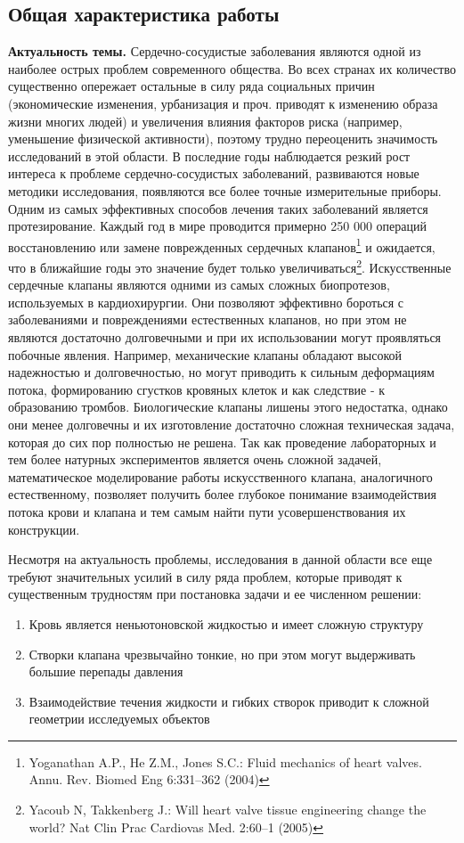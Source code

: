 \subsection*{\Large Общая характеристика работы}
\fontsize{14pt}{15pt}\selectfont
\textbf{Актуальность темы.}
Сердечно-сосудистые заболевания являются одной из наиболее острых проблем
современного общества. Во всех странах их количество существенно опережает
остальные в силу ряда социальных причин (экономические изменения, урбанизация и
проч. приводят к изменению образа жизни многих людей) и увеличения влияния
факторов риска (например, уменьшение физической активности), поэтому трудно
переоценить значимость исследований в этой области. В последние годы
наблюдается резкий рост интереса к проблеме сердечно-сосудистых заболеваний,
развиваются новые методики исследования, появляются все более точные
измерительные приборы. Одним из самых эффективных способов лечения таких
заболеваний является протезирование. Каждый год в мире проводится
примерно 250 000 операций восстановлению или замене поврежденных сердечных
клапанов\footnote{
    Yoganathan A.P., He Z.M., Jones S.C.: Fluid mechanics of heart valves.  Annu. Rev.
    Biomed Eng 6:331--362 (2004)
} %
и ожидается, что в ближайшие годы это значение будет только увеличиваться\footnote{
    Yacoub N, Takkenberg J.: Will heart valve tissue engineering change the world? Nat
    Clin Prac Cardiovas Med. 2:60--1 (2005)
}.
Искусственные сердечные клапаны являются одними из самых сложных биопротезов,
используемых в кардиохирургии. Они позволяют эффективно бороться с
заболеваниями и повреждениями естественных клапанов, но при этом не являются
достаточно долговечными и при их использовании могут проявляться побочные
явления. Например, механические клапаны обладают высокой надежностью и
долговечностью, но могут приводить к сильным деформациям потока, формированию
сгустков кровяных клеток и как следствие - к образованию тромбов. Биологические
клапаны лишены этого недостатка, однако они менее долговечны и их изготовление
достаточно сложная техническая задача, которая до сих пор полностью не решена.
Так как проведение лабораторных и тем более натурных экспериментов является
очень сложной задачей, математическое моделирование работы искусственного
клапана, аналогичного естественному, позволяет получить более глубокое
понимание взаимодействия потока крови и клапана и тем самым найти пути
усовершенствования их конструкции.

Несмотря на актуальность проблемы, исследования в данной области все еще требуют
значительных усилий в силу ряда проблем, которые приводят к существенным трудностям
при постановка задачи и ее численном решении:
\begin{enumerate}
 \item Кровь является неньютоновской жидкостью и имеет сложную структуру
 \item Створки клапана чрезвычайно тонкие, но при этом могут выдерживать
     большие перепады давления
 \item Взаимодействие течения жидкости и гибких створок приводит к сложной
     геометрии исследуемых объектов
\end{enumerate}

